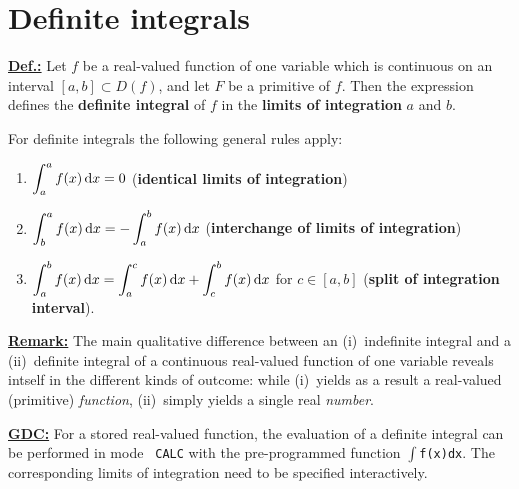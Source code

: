 \section[Definite integrals]{Definite integrals}
\medskip
\noindent
\underline{\bf Def.:} Let $f$ be a real-valued function of one variable which is continuous on an interval $[a,b] \subset D(f)$, and let $F$ be a primitive of $f$. Then the expression
%
\be
{}
\ee
%
defines the {\bf definite integral} of $f$ in the 
{\bf limits of integration} $a$ and $b$.

\medskip
\noindent
For definite integrals the following general rules apply:
%
\begin{enumerate}
\item $\displaystyle\int_{a}^{a}f(x)\,{\rm d}x = 0$
\hfill ({\bf identical limits of integration})
\item $\displaystyle\int_{b}^{a}f(x)\,{\rm d}x = 
-\int_{a}^{b}f(x)\,{\rm d}x$
\hfill ({\bf interchange of limits of integration})
\item $\displaystyle\int_{a}^{b}f(x)\,{\rm d}x = 
\int_{a}^{c}f(x)\,{\rm d}x
+ \int_{c}^{b}f(x)\,{\rm d}x$ for $c \in [a,b]$
\hfill ({\bf split of integration interval}).
\end{enumerate}
%

\medskip
\noindent
\underline{\bf Remark:} The main qualitative difference between an 
(i)~indefinite integral and a (ii)~definite integral of a 
continuous real-valued function of one variable reveals intself in 
the different kinds of outcome: while (i)~yields as a result a 
real-valued (primitive) \emph{function}, (ii)~simply yields a 
single real \emph{number}.

\medskip
\noindent
\underline{\bf GDC:} For a stored real-valued function, the 
evaluation of a definite integral can be performed in mode {\tt 
CALC} with the pre-programmed function $\int${\tt f(x)dx}. The 
corresponding limits of integration need to be specified 
interactively.

